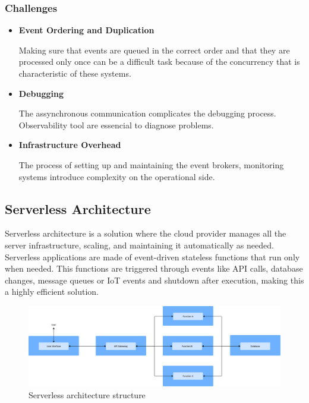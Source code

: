 \subsubsection{Challenges}
\begin{itemize}
	\item \textbf{Event Ordering and Duplication}

	      Making sure that events are queued in the correct order and that they are
	      processed only once can be a difficult task because of the concurrency
	      that is characteristic of these systems.

	\item \textbf{Debugging}

	      The assynchronous communication complicates the debugging process.
	      Observability tool are essencial to diagnose problems.

	\item \textbf{Infrastructure Overhead}

	      The process of setting up and maintaining the event brokers, monitoring
	      systems introduce complexity on the operational side.
\end{itemize}

\subsection{Serverless Architecture}
Serverless architecture is a solution where the cloud provider manages all the
server infrastructure, scaling, and maintaining it automatically as needed.
Serverless applications are made of event-driven stateless functions that run
only when needed\cite{marcelino2024goldfish}. This functions are triggered
through events like \gls{API} calls, database changes, message queues or
\gls{IoT} events and shutdown after execution, making this a highly efficient
solution.

\begin{figure}[htbp]
	\centering
	\includegraphics[width=\textwidth, height=0.5\textheight, keepaspectratio]{Chapters/Figures/Architectures/Serverless.pdf}
	\caption{Serverless architecture structure}
	\label{fig:architectures:serverless}
\end{figure}

